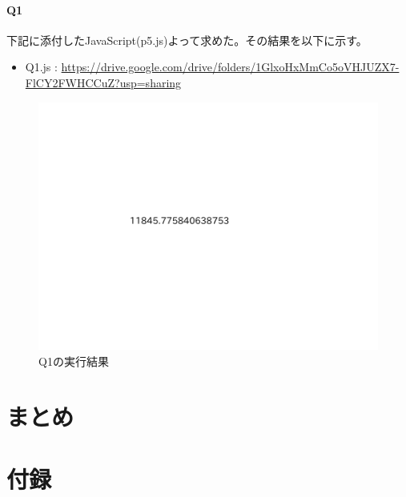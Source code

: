 \documentclass[dvipdfmx]{jsarticle}
\begin{document}
\paragraph{Q1}
下記に添付したJavaScript(p5.js)よって求めた。その結果を以下に示す。
\begin{itemize}
  \item Q1.js : \url{https://drive.google.com/drive/folders/1GlxoHxMmCo5oVHJUZX7-FlCY2FWHCCuZ?usp=sharing}
\end{itemize}
\begin{figure}[H]
  \centering
  \includegraphics[scale=0.3]{Q1_result.png}
  \caption{Q1の実行結果}
\end{figure}
\section{まとめ}
\section{付録}
\end{document}
